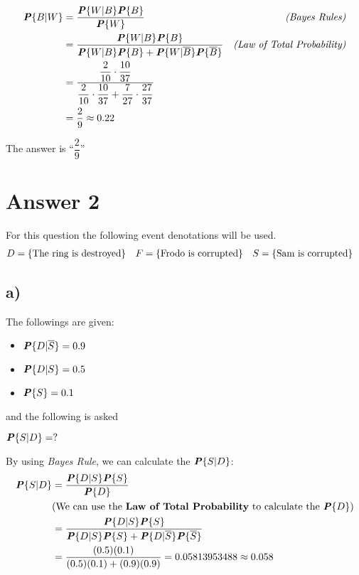 \documentclass[12pt]{article}
\newcommand{\prob}[1]{\textbf{\textit{P}}\{#1\}}
\begin{document}
\begin{align*}
    \prob{B | W} &= \frac{\prob{W | B} \prob{B}}{\prob{W}} &\textit{(Bayes Rules)}\\
    &= \frac{\prob{W | B} \prob{B}}{\prob{W | B} \prob{B} + \prob{W | \overline{B}} \prob{\overline{B}}} &\textit{(Law of Total Probability)}\\
    &= \dfrac{
            \dfrac{2}{10} \cdot \dfrac{10}{37}
        }{
            \dfrac{2}{10} \cdot \dfrac{10}{37} + \dfrac{7}{27} \cdot \dfrac{27}{37}
        }\\
    &= \dfrac{2}{9} \approx 0.22
\end{align*}

\noindent The answer is ``$\dfrac{2}{9}$''


\section*{Answer 2}

For this question the following event denotations will be used.
\begin{align*}
    &
    D = \left\{ \textnormal{The ring is destroyed} \right\}
    &&
    F = \left\{ \textnormal{Frodo is corrupted} \right\}
    &&
    S = \left\{ \textnormal{Sam is corrupted} \right\}
    &
\end{align*}

\subsection*{a)}

\noindent The followings are given:

\begin{multicols}{3}
    \begin{itemize}
        \item $\prob{D | \overline{S}} = 0.9$
        \item $\prob{D | S} = 0.5$
        \item $\prob{S} = 0.1$
    \end{itemize}    
\end{multicols}

\noindent and the following is asked

$\prob{S | D} = ?$

\noindent By using \textit{Bayes Rule}, we can calculate the $\prob{S | D}$:
\begin{align*}
    \prob{S | D} &= \frac{\prob{D|S} \prob{S}}{\prob{D}}\\
    &(\textnormal{We can use the \textbf{Law of Total Probability} to calculate the $\prob{D}$})\\
    &= \frac{\prob{D|S} \prob{S}}{\prob{D|S} \prob{S} + \prob{D|\overline{S}} \prob{\overline{S}}}\\
    &= \frac{(0.5)(0.1)}{(0.5)(0.1)+(0.9)(0.9)} = 0.05813953488 \approx 0.058
\end{align*}
\end{document}
